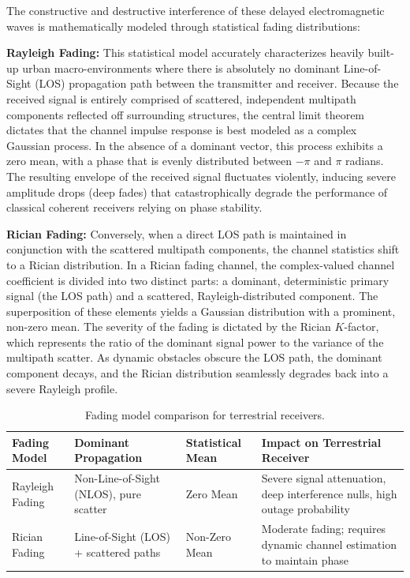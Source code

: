 \documentclass[11pt,a4paper]{article}
\begin{document}
The constructive and destructive interference of these delayed electromagnetic waves is mathematically modeled through statistical fading distributions:

\textbf{Rayleigh Fading:} This statistical model accurately characterizes heavily built-up urban macro-environments where there is absolutely no dominant Line-of-Sight (LOS) propagation path between the transmitter and receiver.\cite{ref25} Because the received signal is entirely comprised of scattered, independent multipath components reflected off surrounding structures, the central limit theorem dictates that the channel impulse response is best modeled as a complex Gaussian process.\cite{ref25} In the absence of a dominant vector, this process exhibits a zero mean, with a phase that is evenly distributed between $-\pi$ and $\pi$ radians.\cite{ref25} The resulting envelope of the received signal fluctuates violently, inducing severe amplitude drops (deep fades) that catastrophically degrade the performance of classical coherent receivers relying on phase stability.\cite{ref19}

\textbf{Rician Fading:} Conversely, when a direct LOS path is maintained in conjunction with the scattered multipath components, the channel statistics shift to a Rician distribution.\cite{ref25} In a Rician fading channel, the complex-valued channel coefficient is divided into two distinct parts: a dominant, deterministic primary signal (the LOS path) and a scattered, Rayleigh-distributed component.\cite{ref28} The superposition of these elements yields a Gaussian distribution with a prominent, non-zero mean.\cite{ref27} The severity of the fading is dictated by the Rician $K$-factor, which represents the ratio of the dominant signal power to the variance of the multipath scatter.\cite{ref28} As dynamic obstacles obscure the LOS path, the dominant component decays, and the Rician distribution seamlessly degrades back into a severe Rayleigh profile.\cite{ref29}

\begin{table}[htbp]
\centering
\caption{Fading model comparison for terrestrial receivers.}
\begin{tabular}{@{}llll@{}}
\toprule
Fading Model & Dominant Propagation & Statistical Mean & Impact on Terrestrial Receiver \\
\midrule
Rayleigh Fading & Non-Line-of-Sight (NLOS), pure scatter & Zero Mean & Severe signal attenuation, deep interference nulls, high outage probability \\
Rician Fading & Line-of-Sight (LOS) + scattered paths & Non-Zero Mean & Moderate fading; requires dynamic channel estimation to maintain phase \\
\bottomrule
\end{tabular}
\end{table}
\end{document}
